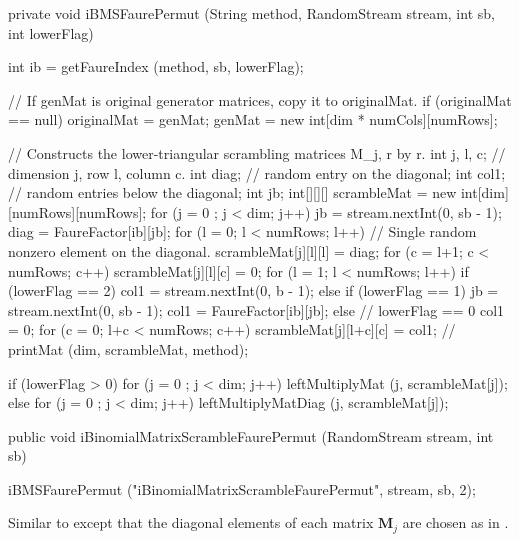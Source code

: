 \begin{code}\begin{hide}

   private void iBMSFaurePermut (String method, RandomStream stream,
                                 int sb, int lowerFlag) {
      int ib = getFaureIndex (method, sb, lowerFlag);

      // If genMat is original generator matrices, copy it to originalMat.
      if (originalMat == null) {
         originalMat = genMat;
         genMat = new int[dim * numCols][numRows];
      }

      // Constructs the lower-triangular scrambling matrices M_j, r by r.
      int j, l, c;  // dimension j, row l, column c.
      int diag;     // random entry on the diagonal;
      int col1;     // random entries below the diagonal;
      int jb;
      int[][][] scrambleMat = new int[dim][numRows][numRows];
      for (j = 0 ; j < dim; j++) {
         jb = stream.nextInt(0, sb - 1);
         diag = FaureFactor[ib][jb];
         for (l = 0; l < numRows; l++) {
            // Single random nonzero element on the diagonal.
            scrambleMat[j][l][l] = diag;
            for (c = l+1; c < numRows; c++) scrambleMat[j][l][c] = 0;
         }
         for (l = 1; l < numRows; l++) {
            if (lowerFlag == 2) {
               col1 = stream.nextInt(0, b - 1);
            } else if (lowerFlag == 1) {
               jb = stream.nextInt(0, sb - 1);
               col1 = FaureFactor[ib][jb];
            } else {   // lowerFlag == 0
               col1 = 0;
            }
            for (c = 0; l+c < numRows; c++) scrambleMat[j][l+c][c] = col1;
         }
      }
      // printMat (dim, scrambleMat, method);

      if (lowerFlag > 0)
         for (j = 0 ; j < dim; j++) leftMultiplyMat (j, scrambleMat[j]);
      else
         for (j = 0 ; j < dim; j++) leftMultiplyMatDiag (j, scrambleMat[j]);
   }\end{hide}

   public void iBinomialMatrixScrambleFaurePermut (RandomStream stream,
                                                   int sb)\begin{hide} {
       iBMSFaurePermut ("iBinomialMatrixScrambleFaurePermut",
                              stream, sb, 2);
   }\end{hide}
\end{code}
 \begin{tabb}
   Similar to  except that the diagonal
   elements of each matrix $\mathbf{M}_j$ are chosen as in
  .
\end{tabb}
